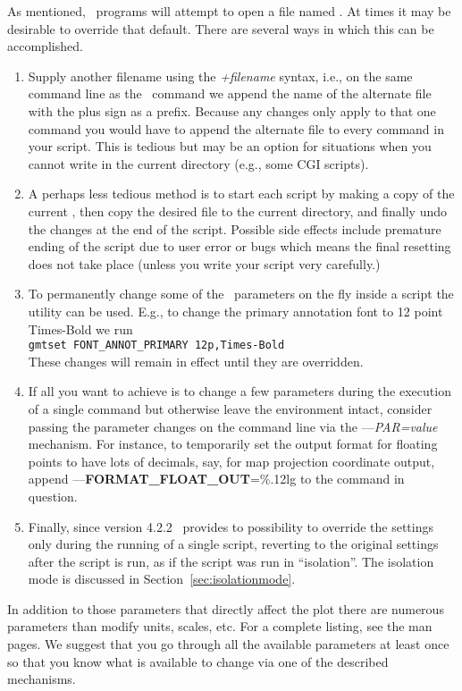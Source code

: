 As mentioned, \GMT\ programs will attempt to open a file named
.  At times it may be desirable to override
that default.  There are several ways in which this can be accomplished.
\begin{enumerate}
\item Supply another filename using the \emph{+filename} syntax, i.e.,
on the same command line as the \GMT\ command we append the name of
the alternate  file with the plus sign as a prefix.
Because any changes only apply to that one command you would have to
append the alternate file to every command in your script.  This is
tedious but may be an option for situations when you cannot write in
the current directory (e.g., some CGI scripts).
\item A perhaps less tedious method is to start each script by making a
copy of the current , then copy the desired
 file to the current directory, and finally
undo the changes at the end of the script.  Possible side effects
include premature ending of the script due to user error or bugs which
means the final resetting does not take place (unless you write your
script very carefully.)
\item To permanently change some of the \GMT\ parameters on the fly
inside a script the  utility can be used.  E.g., to
change the primary annotation font to 12 point Times-Bold we run \\

\texttt{gmtset FONT\_ANNOT\_PRIMARY 12p,Times-Bold} \\

These changes will remain in effect until they are overridden.
\item If all you want to achieve is to change a few parameters during
the execution of a single command but otherwise leave the environment intact, consider
passing the parameter changes on the command line via the {--}{--}\emph{PAR=value}
mechanism.  For instance, to temporarily set the output format for floating
points to have lots of decimals, say, for map projection coordinate output,
append {--}{--}\textbf{FORMAT\_FLOAT\_OUT}=\%.12lg to the command in question.
\item Finally, since version 4.2.2 \GMT\ provides to possibility to override the
settings only  during the running of a single script, reverting to the original settings
after the script is run, as if the script was run in ``isolation''. The isolation mode
is discussed in Section~\ref{sec:isolationmode}.
\end{enumerate}
In addition to those parameters
that directly affect the plot there are numerous parameters than
modify units, scales, etc.  For a complete listing, see the
 man pages.  We suggest that you go through
all the available parameters at least once so that you know what is
available to change via one of the described mechanisms.

